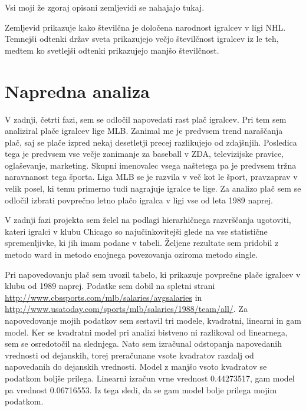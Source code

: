 \documentclass[11pt,a4paper]{article}
\begin{document}
Vsi moji že zgoraj opisani zemljevidi se nahajajo tukaj.




Zemljevid prikazuje kako številčna je določena narodnost igralcev v ligi NHL.
Temnejši odtenki držav sveta prikazujejo večjo številčnost igralcev iz le teh, medtem ko svetlejši odtenki prikazujejo manjšo številčnost. 



\pagebreak
\section{Napredna analiza}

V zadnji, četrti fazi, sem se odločil napovedati rast plač igralcev. Pri tem sem analiziral plače igralcev lige MLB. Zanimal me je predvsem trend naraščanja plač, saj se plače izpred nekaj desetletji precej razlikujejo od zdajšnjih. Posledica tega je predvsem vse večje zanimanje za baseball v ZDA, televizijske pravice, oglaševanje, marketing. Skupni imenovalec vsega naštetega pa je predvsem tržna naravnanost tega športa. Liga MLB se je razvila v več kot le šport, pravzaprav v velik posel, ki temu primerno tudi nagrajuje igralce te lige. Za analizo plač sem se odločil izbrati povprečno letno plačo igralca v ligi vse od leta 1989 naprej.

V zadnji fazi projekta sem želel na podlagi hierarhičnega razvrščanja ugotoviti, kateri igralci v klubu Chicago so najučinkovitejši glede na vse statistične spremenljivke, ki jih imam podane v tabeli. Željene rezultate sem pridobil z metodo ward in metodo enojnega povezovanja oziroma metodo single.

Pri napovedovanju plač sem uvozil tabelo, ki prikazuje povprečne plače igralcev v klubu od 1989 naprej. Podatke sem dobil na spletni strani \url{http://www.cbssports.com/mlb/salaries/avgsalaries} in \url{http://www.usatoday.com/sports/mlb/salaries/1988/team/all/}.
Za napovedovanje mojih podatkov  sem sestavil tri modele, kvadratni, linearni in gam model. Ker se kvadratni model pri analizi bistveno ni razlikoval od linearnega, sem se osredotočil na slednjega. Nato sem izračunal odstopanja napovedanih vrednosti od dejanskih, torej preračunane vsote kvadratov razdalj od napovedanih do dejanskih vrednosti. Model z manjšo vsoto kvadratov se podatkom boljše prilega. Linearni izračun vrne vrednost 0.44273517, gam model pa vrednost 0.06716553. Iz tega sledi, da se gam model bolje prilega mojim podatkom.
\end{document}

